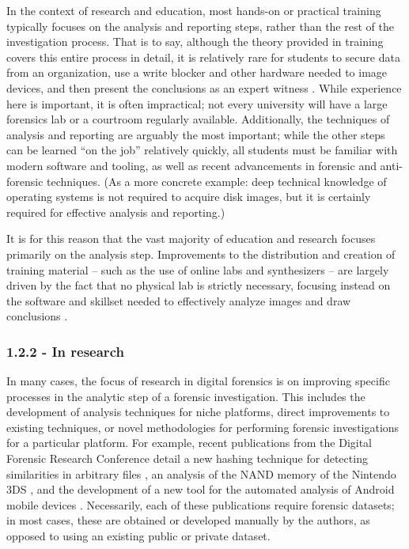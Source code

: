 In the context of research and education, most hands-on or practical
training typically focuses on the analysis and reporting steps, rather
than the rest of the investigation process. That is to say, although the
theory provided in training covers this entire process in detail, it is
relatively rare for students to secure data from an organization, use a
write blocker and other hardware needed to image devices, and then
present the conclusions as an expert witness
\cite{cooperStandardsDigitalForensics2010}. While experience here is
important, it is often impractical; not every university will have a
large forensics lab or a courtroom regularly available. Additionally,
the techniques of analysis and reporting are arguably the most
important; while the other steps can be learned ``on the job''
relatively quickly, all students must be familiar with modern software
and tooling, as well as recent advancements in forensic and
anti-forensic techniques. (As a more concrete example: deep technical
knowledge of operating systems is not required to acquire disk images,
but it is certainly required for effective analysis and reporting.)

It is for this reason that the vast majority of education and research
focuses primarily on the analysis step. Improvements to the distribution
and creation of training material -- such as the use of online labs and
synthesizers -- are largely driven by the fact that no physical lab is
strictly necessary, focusing instead on the software and skillset needed
to effectively analyze images and draw conclusions
\cite{bruecknerAutomatedComputerForensics2008,lawrenceFrameworkDesignWebbased2009}.

\subsubsection{1.2.2 - In research}\label{in-research}

In many cases, the focus of research in digital forensics is on
improving specific processes in the analytic step of a forensic
investigation. This includes the development of analysis techniques for
niche platforms, direct improvements to existing techniques, or novel
methodologies for performing forensic investigations for a particular
platform. For example, recent publications from the Digital Forensic
Research Conference detail a new hashing technique for detecting
similarities in arbitrary files \cite{changFbHashNewSimilarity2019},
an analysis of the NAND memory of the Nintendo 3DS
\cite{pessolanoForensicAnalysisNintendo2019}, and the development of
a new tool for the automated analysis of Android mobile devices
\cite{linAutomatedForensicAnalysis2018}. Necessarily, each of these
publications require forensic datasets; in most cases, these are
obtained or developed manually by the authors, as opposed to using an
existing public or private dataset.

